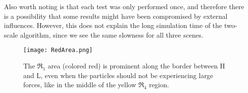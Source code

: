 \documentclass[../../main.tex]{subfiles}
\begin{document}
Also worth noting is that each test was only performed once, and therefore there is a possibility that some results might have been compromised by external influences. However, this does not explain the long simulation time of the two-scale algorithm, since we see the same slowness for all three scenes. 

\begin{figure}[h]
    \centering
    \texttt{[image: RedArea.png]}
    \caption[Lower time step along the border]{The $\Re_1$ area (colored red) is prominent along the border between H and L, even when the particles should not be experiencing large forces, like in the middle of the yellow $\Re_4$ region. }
    \label{fig:redarea}
\end{figure}
\end{document}
